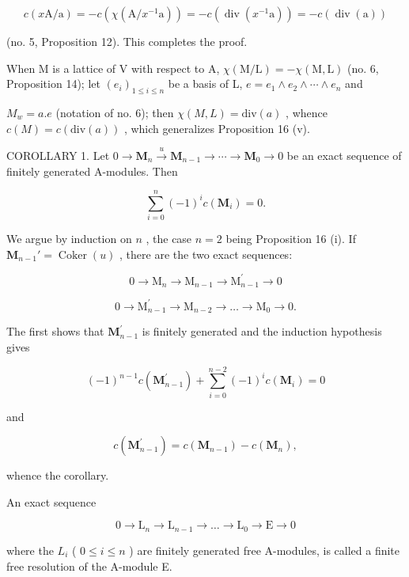 \[
c (x \mathrm{A} / \mathrm{a}) = - c (\chi (\mathrm{A} / x ^ {- 1} \mathrm{a})) = - c (\operatorname{div} (x ^ {- 1} \mathrm{a})) = - c (\operatorname{div} (\mathrm{a}))
\]

(no. 5, Proposition 12). This completes the proof.

When M is a lattice of V with respect to A, \(\chi(\mathrm{M}/\mathrm{L}) = -\chi(\mathrm{M}, \mathrm{L})\) (no. 6, Proposition 14); let \((e_{i})_{1 \leqslant i \leqslant n}\) be a basis of L, \(e = e_{1} \wedge e_{2} \wedge \cdots \wedge e_{n}\) and

\(M_{w} = a.e\) (notation of no. 6); then \(\chi(M, L) = \text{div}(a)\) , whence \(c(M) = c(\text{div}(a))\) , which generalizes Proposition 16 (v).

COROLLARY 1. Let \(0 \to \mathbf{M}_n \xrightarrow{u} \mathbf{M}_{n-1} \to \cdots \to \mathbf{M}_0 \to 0\) be an exact sequence of finitely generated A-modules. Then

\[
\sum_ {i = 0} ^ {n} (- 1) ^ {i} c (\mathbf {M} _ {i}) = 0.
\]

We argue by induction on \(n\) , the case \(n = 2\) being Proposition 16 (i). If \(\mathbf{M}_{n-1}' = \operatorname{Coker}(u)\) , there are the two exact sequences:

\[
0 \rightarrow \mathrm{M} _ {n} \rightarrow \mathrm{M} _ {n - 1} \rightarrow \mathrm{M} _ {n - 1} ^ {\prime} \rightarrow 0
\]

\[
0 \rightarrow \mathrm{M} _ {n - 1} ^ {\prime} \rightarrow \mathrm{M} _ {n - 2} \rightarrow \dots \rightarrow \mathrm{M} _ {0} \rightarrow 0.
\]

The first shows that \(\mathbf{M}_{n - 1}^{\prime}\) is finitely generated and the induction hypothesis gives

\[
(- 1) ^ {n - 1} c (\mathbf {M} _ {n - 1} ^ {\prime}) + \sum_ {i = 0} ^ {n - 2} (- 1) ^ {i} c (\mathbf {M} _ {i}) = 0
\]

and

\[
c (\mathbf {M} _ {n - 1} ^ {\prime}) = c (\mathbf {M} _ {n - 1}) - c (\mathbf {M} _ {n}),
\]

whence the corollary.

An exact sequence

\[
0 \rightarrow \mathrm{L} _ {n} \rightarrow \mathrm{L} _ {n - 1} \rightarrow \dots \rightarrow \mathrm{L} _ {0} \rightarrow \mathrm{E} \rightarrow 0
\]

where the \(L_{i}\) ( \(0 \leqslant i \leqslant n\) ) are finitely generated free A-modules, is called a finite free resolution of the A-module E.

